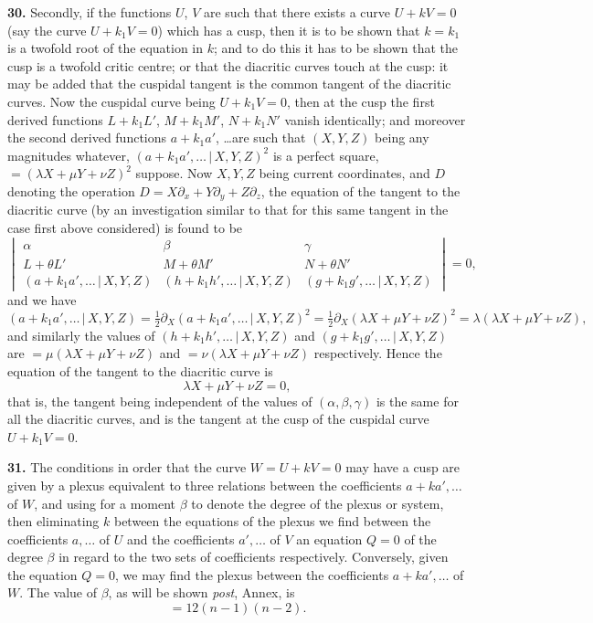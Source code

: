 \documentclass[11pt,a4paper]{article}
\providecommand{\mid}{\,|\,}
\begin{document}
\textbf{30.} Secondly, if the functions $U$, $V$ are such that there exists a curve $U + kV = 0$ (say the curve $U + k_1 V = 0$) which has a cusp, then it is to be shown that $k = k_1$ is a twofold root of the equation in $k$; and to do this it has to be shown that the cusp is a twofold critic centre; or that the diacritic curves touch at the cusp: it may be added that the cuspidal tangent is the common tangent of the diacritic curves. Now the cuspidal curve being $U + k_1 V = 0$, then at the cusp the first derived functions $L + k_1 L'$, $M + k_1 M'$, $N + k_1 N'$ vanish identically; and moreover the second derived functions $a + k_1 a'$, \ldots are such that $(X, Y, Z)$ being any magnitudes whatever, $(a + k_1 a', \ldots \mid X, Y, Z)^2$ is a perfect square, $= (\lambda X + \mu Y + \nu Z)^2$ suppose. Now $X, Y, Z$ being current coordinates, and $D$ denoting the operation $D = X\partial_x + Y\partial_y + Z\partial_z$, the equation of the tangent to the diacritic curve (by an investigation similar to that for this same tangent in the case first above considered) is found to be
\[
\begin{vmatrix} \alpha & \beta & \gamma \\ L + \theta L' & M + \theta M' & N + \theta N' \\ (a + k_1 a', \ldots \mid X, Y, Z) & (h + k_1 h', \ldots \mid X, Y, Z) & (g + k_1 g', \ldots \mid X, Y, Z) \end{vmatrix} = 0,
\]
and we have
\[
(a + k_1 a', \ldots \mid X, Y, Z) = \tfrac{1}{2}\partial_X (a + k_1 a', \ldots \mid X, Y, Z)^2 = \tfrac{1}{2}\partial_X(\lambda X + \mu Y + \nu Z)^2 = \lambda(\lambda X + \mu Y + \nu Z),
\]
and similarly the values of $(h + k_1 h', \ldots \mid X, Y, Z)$ and $(g + k_1 g', \ldots \mid X, Y, Z)$ are $= \mu(\lambda X + \mu Y + \nu Z)$ and $= \nu(\lambda X + \mu Y + \nu Z)$ respectively. Hence the equation of the tangent to the diacritic curve is
\[
\lambda X + \mu Y + \nu Z = 0,
\]
that is, the tangent being independent of the values of $(\alpha, \beta, \gamma)$ is the same for all the diacritic curves, and is the tangent at the cusp of the cuspidal curve $U + k_1 V = 0$.

\medskip

\textbf{31.} The conditions in order that the curve $W = U + kV = 0$ may have a cusp are given by a plexus equivalent to three relations between the coefficients $a + ka', \ldots$ of $W$, and using for a moment $\beta$ to denote the degree of the plexus or system, then eliminating $k$ between the equations of the plexus we find between the coefficients $a, \ldots$ of $U$ and the coefficients $a', \ldots$ of $V$ an equation $Q = 0$ of the degree $\beta$ in regard to the two sets of coefficients respectively. Conversely, given the equation $Q = 0$, we may find the plexus between the coefficients $a + ka', \ldots$ of $W$. The value of $\beta$, as will be shown \textit{post}, Annex, is
\[
= 12(n - 1)(n - 2).
\]
\end{document}
